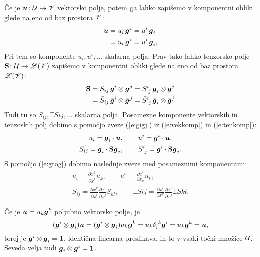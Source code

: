 Če je $\boldsymbol u\colon \mathcal U\to\mathscr V$ vektorsko polje, potem ga lahko zapišemo v komponentni
obliki glede na eno od baz prostora $\mathscr V$:
\begin{align}
	\boldsymbol u&=u_i\,\boldsymbol g^i=u^i\,\boldsymbol g_i \nonumber \\
	&=\bar{u}_i\,\bar{\boldsymbol g}^i=\bar{u}^i\,\bar{\boldsymbol g}_i, \label{e:vekkomp}
\end{align}
Pri tem so komponente $u_i,u^i,\dots$ skalarna polja.
Prav tako lahko tenzorsko polje $\mathbf S\colon \mathcal U\to\mathscr L(\mathscr V)$ zapišemo v
komponentni obliki glede na eno od baz prostora $\mathscr L(\mathscr V)$:
\begin{align}
	\ten{S}&=S_{ij}\,\vek{g}^i\otimes\vek{g}^j=\topbot{S}{i}{j}\,\vek{g}_i\otimes\vek{g}^j \nonumber \\
	&=\bar{S}_{ij}\,\bar{\vek{g}}^i\otimes\bar{\vek{g}}^j=
	\topbot{\bar{S}}{i}{j}\,\bar{\vek{g}}_i\otimes\bar{\vek{g}}^j \label{e:tenkomp}
\end{align}
Tudi tu so $S_{ij},\topbot{S}{i}{j},\dots$ skalarna polja.
Posamezne komponente vektorskih in tenzoskih polj dobimo s pomočjo zveze (\ref{e:gigj})
iz (\ref{e:vekkomp}) in (\ref{e:tenkomp}):
\begin{gather}
	u_i=\vek{g}_i\cdot\vek{u},\qquad u^i=\vek{g}^i\cdot\vek{u}, \label{e:kompvek} \\
	S_{ij}=\vek{g}_i\cdot\ten{S}\vek{g}_j,\qquad\topbot{S}{i}{j}=\vek{g}^i\cdot\ten{S}\vek{g}_j.\label{e:kompten}
\end{gather}
S pomočjo (\ref{e:gtog}) dobimo naslednje zveze med posameznimi komponentami:
\begin{gather*}
	\bar{u}_i=\frac{\partial x^k}{\partial\bar{x}^i}u_k, \qquad
	\bar{u}^i=\frac{\partial\bar{x}^i}{\partial x_k}u_k, \\
	\bar{S}_{ij}=\frac{\partial x^k}{\partial\bar{x}^i}\frac{\partial x^l}{\partial\bar{x}^j}S_{kl}, \qquad
	\topbot{\bar{S}}{i}{j}=\frac{\partial\bar{x}^i}{\partial x^k}\frac{\partial x^l}{\partial\bar{x}^j}\topbot{S}{k}{l}.
\end{gather*}

Če je $\boldsymbol u=u_k\boldsymbol g^k$ poljubno vektorsko polje, je
\begin{equation} \label{e:iten}
	(\vek{g}^i\otimes\vek{g}_i)\vek{u}=(\vek{g}^i\otimes\vek{g}_i)u_k\vek{g}^k=
	u_k\bottop{\delta}{i}{k}\vek{g}^i=u_k\vek{g}^k=\vek{u},
\end{equation}
torej je $\boldsymbol g^i\otimes\boldsymbol g_i=\mathbf 1$, identična linearna preslikava, in to
v vsaki točki množice $\mathcal U$. Seveda velja tudi $\boldsymbol g_i\otimes\boldsymbol g^i=\mathbf 1$.


